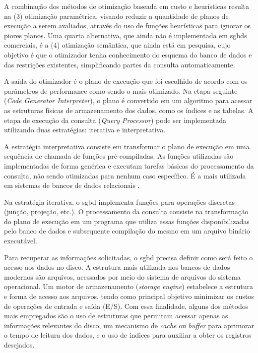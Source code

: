 A combinação dos métodos de otimização baseada em custo e heurísticas resulta na (3) otimização paramétrica, visando reduzir a quantidade de planos de execução a serem avaliados, através do uso de funções heurísticas para ignorar os piores planos. Uma quarta alternativa, que ainda não é implementada em \glspl{sgbd} comerciais, é a (4) otimização semântica, que ainda está em pesquisa, cujo objetivo é que o otimizador tenha conhecimento do esquema do banco de dados e das restrições existentes, simplificando partes da consulta automaticamente.

A saída do otimizador é o plano de execução que foi escolhido de acordo com os parâmetros de performance como sendo o mais otimizado. Na etapa seguinte (\emph{Code Generator Interpreter}), o plano é convertido em um algoritmo para acessar as estruturas físicas de armazenamento dos dados, como os índices e as tabelas. A etapa de execução da consulta (\emph{Query Processor}) pode ser implementada utilizando duas estratégias: iterativa e interpretativa.

A estratégia interpretativa consiste em transformar o plano de execução em uma sequência de chamada de funções pré-compiladas. As funções utilizadas são implementadas de forma genérica e executam tarefas básicas do processamento da consulta, não sendo otimizadas para nenhum caso específico. É a mais utilizada em sistemas de bancos de dados relacionais \cite[p. 35]{Bell:2012}.

Na estratégia iterativa, o \gls{sgbd} implementa funções para operações discretas (junção, projeção, etc.). O processamento da consulta consiste na transformação do plano de execução em um programa que utiliza essas funções disponibilizadas pelo banco de dados e subsequente compilação do mesmo em um arquivo binário executável.

Para recuperar as informações solicitadas, o \gls{sgbd} precisa definir como será feito o acesso aos dados no disco. A estrutura mais utilizada nos bancos de dados modernos são arquivos, acessados por meio do sistema de arquivos do sistema operacional. Um motor de armazenamento (\emph{storage engine}) estabelece a estrutura e forma de acesso aos arquivos, tendo como principal objetivo minimizar os custos de operações de entrada e saída (E/S). Com essa finalidade, alguns dos métodos mais empregados são o uso de estruturas que permitam acessar apenas as informações relevantes do disco, um mecanismo de \emph{cache} ou \emph{buffer} para aprimorar o tempo de leitura dos dados, e o uso de índices para auxiliar a obter os registros desejados.
